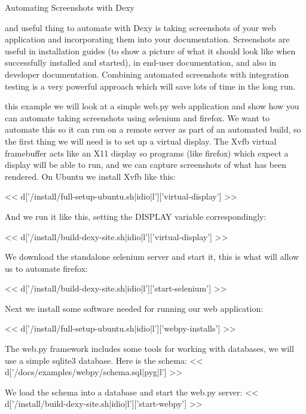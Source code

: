 \documentclass[custom, plainsections]{sciposter}
\begin{document}
\begin{multicols*}{2}
\small

\large
Automating Screenshots with Dexy
\small

\label{sec:automating-screenshots}

\vspace{5pt}

 and useful thing to automate with Dexy is taking screenshots of your web application and incorporating them into your documentation. Screenshots are useful in installation guides (to show a picture of what it should look like when successfully installed and started), in end-user documentation, and also in developer documentation. Combining automated screenshots with integration testing is a very powerful approach which will save lots of time in the long run.

 this example we will look at a simple web.py web application and show how you can automate taking screenshots using selenium and firefox. We want to automate this so it can run on a remote server as part of an automated build, so the first thing we will need is to set up a virtual display. The Xvfb virtual framebuffer acts like an X11 display so programs (like firefox) which expect a display will be able to run, and we can capture screenshots of what has been rendered. On Ubuntu we install Xvfb like this:

<< d['/install/full-setup-ubuntu.sh|idio|l']['virtual-display'] >>

And we run it like this, setting the DISPLAY variable correspondingly:

<< d['/install/build-dexy-site.sh|idio|l']['virtual-display'] >>

We download the standalone selenium server and start it, this is what will allow us to automate firefox:

<< d['/install/build-dexy-site.sh|idio|l']['start-selenium'] >>

Next we install some software needed for running our web application:

<< d['/install/full-setup-ubuntu.sh|idio|l']['webpy-installs'] >>

The web.py framework includes some tools for working with databases, we will use a simple sqlite3 database. Here is the schema:
<< d['/docs/examples/webpy/schema.sql|pyg|l'] >>

We load the schema into a database and start the web.py server:
<< d['/install/build-dexy-site.sh|idio|l']['start-webpy'] >>


\end{multicols*}
\end{document}
